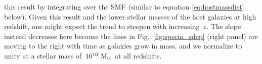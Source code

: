\documentclass[foo.tex]{subfiles}
\begin{document}
this result by integrating over the SMF (similar to equation
\ref{eq:hostmassdist} below).
Given this result and the lower stellar masses of the host galaxies at high
redshift, one might expect the trend to steepen with increasing~$z$.
The slope instead decreases here because the lines in Fig.~\ref{fig:specia_zdep}
(right panel) are moving to the right with time as galaxies grow in mass, and
we normalize to unity at a stellar mass of~$10^{10}~\text{M}_\odot$ at all redshifts.
\end{document}
